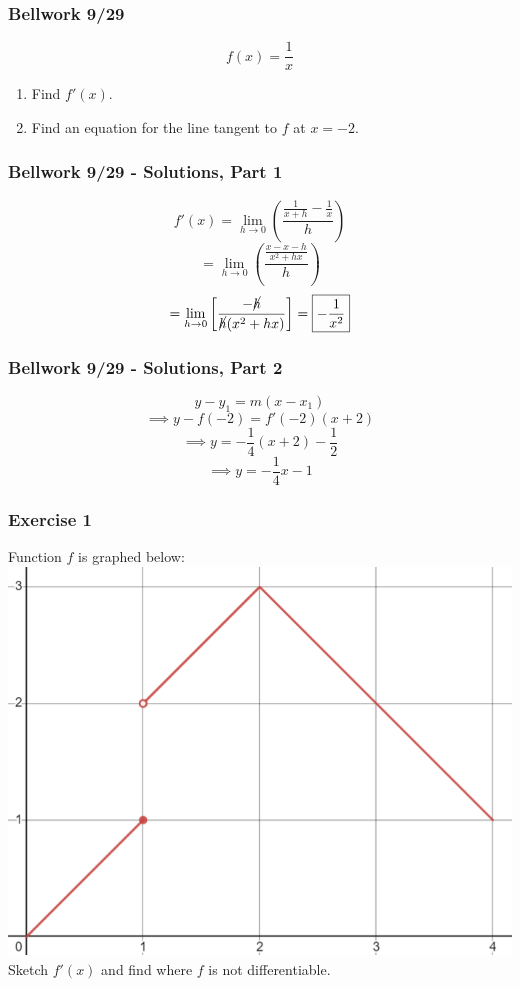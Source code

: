 \documentclass[12pt]{beamer}
\begin{document}
\begin{frame}
	\frametitle{Bellwork 9/29}
	\initclock

	\Large
	\[f(x) = \frac{1}{x}\]
	\begin{enumerate}\itemsep2ex
		\item Find $f'(x)$.
		\item Find an equation for the line tangent to $f$ at $x=-2$.
	\end{enumerate}
	\vfill
	\vfill

	\small
	\crono
\end{frame}
\begin{frame}
	\frametitle{Bellwork 9/29 - Solutions, Part 1}

	\large
	\[f'(x) = \displaystyle\lim_{h\to 0}\left(\frac{\frac{1}{x+h}-\frac{1}{x}}{h}\right)\]
	\[=\displaystyle\lim_{h\to 0}\left(\frac{\frac{x-x-h}{x^2+hx}}{h}\right)\]
	\[=\displaystyle\lim_{h\to 0}\left[\frac{-\cancel{h}}{\cancel{h}(x^2+hx)}\right]=\boxed{-\frac{1}{x^2}}\]
\end{frame}
\begin{frame}
	\frametitle{Bellwork 9/29 - Solutions, Part 2}

	\large
	\vfill
	\vfill
	\vfill
	\vfill
	\[y-y_1=m(x-x_1)\]
	\vfill
	\[\implies y-f(-2)=f'(-2)(x+2)\]
	\[\implies y=-\frac{1}{4}(x+2)-\frac{1}{2}\]
	\[\implies \boxed{y=-\frac{1}{4}x-1}\]
	\vfill
	\vfill
	\vfill
	\vfill
\end{frame}
\begin{frame}
	\frametitle{Exercise 1}

	\begin{center}
		\vfill
		Function $f$ is graphed below:
		\vfill
		\includegraphics[scale=0.5]{exercise_1_graph.png}
		\vfill
		Sketch $f'(x)$ and find where $f$ is not differentiable.
		\vfill
	\end{center}
\end{frame}
\end{document}
